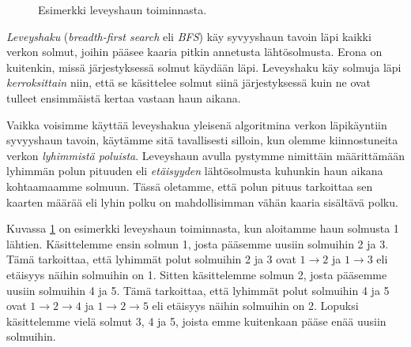 \begin{figure}
\begin{center}
\end{center}
\caption{Esimerkki leveyshaun toiminnasta.}
\label{fig:levhak}
\end{figure}


\emph{Leveyshaku} (\emph{breadth-first search} eli \emph{BFS})
käy syvyyshaun tavoin läpi kaikki verkon solmut,
joihin pääsee kaaria pitkin annetusta lähtösolmusta.
Erona on kuitenkin, missä järjestyksessä solmut käydään läpi.
Leveyshaku käy solmuja läpi \emph{kerroksittain} niin,
että se käsittelee solmut siinä järjestyksessä kuin ne
ovat tulleet ensimmäistä kertaa vastaan haun aikana.


Vaikka voisimme käyttää leveyshakua yleisenä
algoritmina verkon läpi\-käyntiin syvyyshaun tavoin,
käytämme sitä tavallisesti silloin,
kun olemme kiinnostuneita verkon \emph{lyhimmistä poluista}.
Leveyshaun avulla pystymme nimittäin määrit\-tämään
lyhimmän polun pituuden eli \emph{etäisyyden} lähtösolmusta
kuhunkin haun aikana kohtaamaamme solmuun.
Tässä oletamme, että polun pituus tarkoittaa sen
kaarten määrää eli lyhin polku on mahdollisimman vähän
kaaria sisältävä polku.

Kuvassa \ref{fig:levhak} on esimerkki leveyshaun toiminnasta,
kun aloitamme haun solmusta 1 lähtien.
Käsittelemme ensin solmun 1, josta pääsemme uusiin solmuihin 2 ja 3.
Tämä tarkoittaa, että lyhimmät polut solmuihin 2 ja 3
ovat $1 \rightarrow 2$ ja $1 \rightarrow 3$ eli etäisyys näihin solmuihin on 1.
Sitten käsittelemme solmun 2, josta pääsemme uusiin solmuihin 4 ja 5.
Tämä tarkoittaa, että lyhimmät polut solmuihin 4 ja 5
ovat $1 \rightarrow 2 \rightarrow 4$ ja $1 \rightarrow 2 \rightarrow 5$
eli etäisyys näihin solmuihin on 2.
Lopuksi käsittelemme vielä solmut 3, 4 ja 5,
joista emme kuitenkaan pääse enää uusiin solmuihin.

